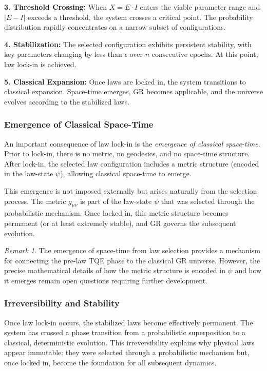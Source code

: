 \documentclass[12pt,a4paper]{article}
\theoremstyle{definition}
\theoremstyle{remark}
\newtheorem{remark}{Remark}[section]
\begin{document}
\textbf{3. Threshold Crossing:} When $X = E \cdot I$ enters the viable parameter range and $|E - I|$ exceeds a threshold, the system crosses a critical point. The probability distribution rapidly concentrates on a narrow subset of configurations.

\textbf{4. Stabilization:} The selected configuration exhibits persistent stability, with key parameters changing by less than $\epsilon$ over $n$ consecutive epochs. At this point, law lock-in is achieved.

\textbf{5. Classical Expansion:} Once laws are locked in, the system transitions to classical expansion. Space-time emerges, GR becomes applicable, and the universe evolves according to the stabilized laws.

\subsubsection{Emergence of Classical Space-Time}

An important consequence of law lock-in is the \emph{emergence of classical space-time}. Prior to lock-in, there is no metric, no geodesics, and no space-time structure. After lock-in, the selected law configuration includes a metric structure (encoded in the law-state $\psi$), allowing classical space-time to emerge.

This emergence is not imposed externally but arises naturally from the selection process. The metric $g_{\mu\nu}$ is part of the law-state $\psi$ that was selected through the probabilistic mechanism. Once locked in, this metric structure becomes permanent (or at least extremely stable), and GR governs the subsequent evolution.

\begin{remark}
The emergence of space-time from law selection provides a mechanism for connecting the pre-law TQE phase to the classical GR universe. However, the precise mathematical details of how the metric structure is encoded in $\psi$ and how it emerges remain open questions requiring further development.
\end{remark}

\subsubsection{Irreversibility and Stability}

Once law lock-in occurs, the stabilized laws become effectively permanent. The system has crossed a phase transition from a probabilistic superposition to a classical, deterministic evolution. This irreversibility explains why physical laws appear immutable: they were selected through a probabilistic mechanism but, once locked in, become the foundation for all subsequent dynamics.
\end{document}
